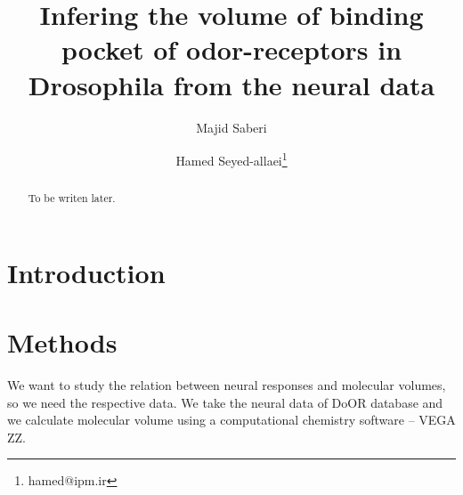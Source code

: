 \documentclass[11pt]{paper} %
\title{Infering the volume of binding pocket of odor-receptors in Drosophila from the neural data}
\author{Majid Saberi \and Hamed Seyed-allaei\thanks{hamed@ipm.ir}}
\begin{document}
\maketitle
\begin{abstract}
To be writen later.
\end{abstract}

\section{Introduction}

\section{Methods}
We want to study the relation between neural responses and molecular volumes, so we need the respective data. 
We take the neural data of DoOR database \cite{DoOR2010} and we calculate molecular volume using a computational chemistry software -- VEGA ZZ. 
\end{document}
